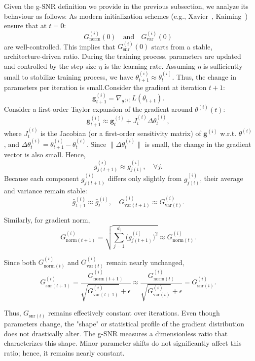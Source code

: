 Given the g-SNR definition we provide in the previous subsection, we analyze its behaviour as follows: As modern initialization schemes (e.g., Xavier~\cite{kumar2017weight}, Kaiming~\cite{he2015delving}) ensure that at \( t=0 \):
\[
G_{\text{norm}}^{(i)}(0) \quad \text{and} \quad G_{\text{var}}^{(i)}(0)
\]
are well-controlled. This implies that \(G_{\text{snr}}^{(i)}(0)\) starts from a stable, architecture-driven ratio. During the training process, parameters are updated and controlled by the step size \(\eta\) is the learning rate. Assuming \(\eta\) is sufficiently small to stabilize training process, we have \( \theta^{(i)}_{t+1} \approx \theta^{(i)}_{t} \). Thus, the change in parameters per iteration is small.Consider the gradient at iteration \( t+1 \):
\[
\mathbf{g}^{(i)}_{t+1} = \nabla_{\theta^{(i)}}L(\theta_{t+1}).
\]
Consider a first-order Taylor expansion of the gradient around \(\theta^{(i)}(t)\):
\[
\mathbf{g}^{(i)}_{t+1} \approx \mathbf{g}^{(i)}_{t} + J^{(i)}_{t}\Delta \theta^{(i)}_{t},
\]
where \(J^{(i)}_{t}\) is the Jacobian 
(or a first-order sensitivity matrix) of \(\mathbf{g}^{(i)}\) w.r.t. \(\theta^{(i)}\), and \(\Delta \theta^{(i)}_{t}=\theta^{(i)}_{t+1}-\theta^{(i)}_{t}\). Since \(\|\Delta \theta^{(i)}_{t}\|\) is small, the change in the gradient vector is also small. Hence,
\[
g_{j(t+1)}^{(i)} \approx g_{j(t)}^{(i)}, \quad \forall j.
\]
Because each component \( g_{j(t+1)}^{(i)} \) differs only slightly from \( g_{j(t)}^{(i)} \), their average and variance remain stable:
\[
\bar{g}^{(i)}_{t+1} \approx \bar{g}^{(i)}_{t}, \quad
G_{\text{var}(t+1)}^{(i)} \approx G_{\text{var}(t)}^{(i)}.
\]

Similarly, for gradient norm,
\[
G_{\text{norm}(t+1)}^{(i)} = \sqrt{\sum_{j=1}^{d_i} \bigl(g_{j(t+1)}^{(i)}\bigr)^2} \approx G_{\text{norm}(t)}^{(i)}.
\]

Since both \( G_{\text{norm}(t)}^{(i)} \) and \( G_{\text{var}(t)}^{(i)} \) remain nearly unchanged,
\[
G_{\text{snr}(t+1)}^{(i)} = \frac{G_{\text{norm}(t+1)}^{(i)}}{\sqrt{G_{\text{var}(t+1)}^{(i)}}+\epsilon} \approx \frac{G_{\text{norm}(t)}^{(i)}}{\sqrt{G_{\text{var}(t)}^{(i)}}+\epsilon} = G_{\text{snr}(t)}^{(i)}.
\]

Thus, \(G_{\text{snr}(t)}^{}\) remains effectively constant over iterations. Even though parameters change, the "shape" or statistical profile of the gradient distribution does not drastically alter. The g-SNR measures a dimensionless ratio that characterizes this shape. Minor parameter shifts do not significantly affect this ratio; hence, it remains nearly constant.



